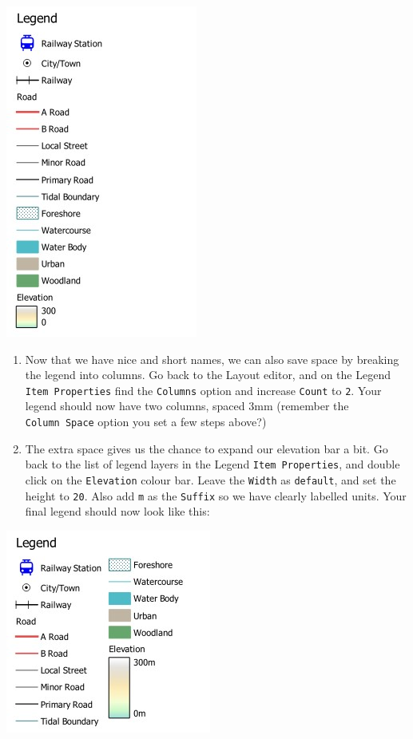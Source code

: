 \documentclass[
  letterpaper,
  DIV=11,
  numbers=noendperiod]{scrreprt}
\begin{document}
\includegraphics{images/lab_8/lab8_fig13_named_legend.jpg}

\begin{enumerate}
\def\labelenumi{(\arabic{enumi})}
\setcounter{enumi}{247}
\item
  Now that we have nice and short names, we can also save space by
  breaking the legend into columns. Go back to the Layout editor, and on
  the Legend \texttt{Item\ Properties} find the \texttt{Columns} option
  and increase \texttt{Count} to \texttt{2}. Your legend should now have
  two columns, spaced 3mm (remember the \texttt{Column\ Space} option
  you set a few steps above?)
\item
  The extra space gives us the chance to expand our elevation bar a bit.
  Go back to the list of legend layers in the Legend
  \texttt{Item\ Properties}, and double click on the \texttt{Elevation}
  colour bar. Leave the \texttt{Width} as \texttt{default}, and set the
  height to \texttt{20}. Also add \texttt{m} as the \texttt{Suffix} so
  we have clearly labelled units. Your final legend should now look like
  this:
\end{enumerate}

\includegraphics{images/lab_8/lab8_fig14_final_legend.jpg}
\end{document}
